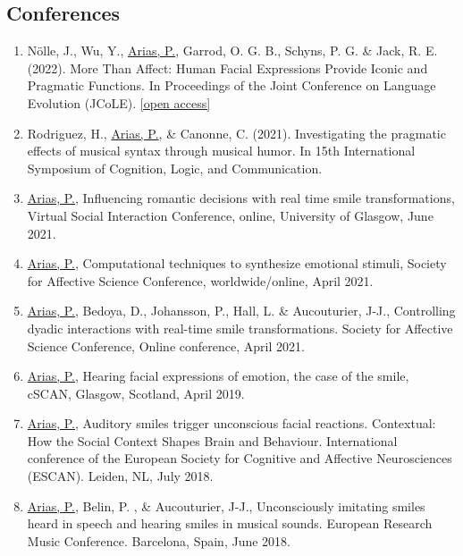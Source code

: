 \documentclass[a4paper, 11pt]{article}
\begin{document}
\subsection*{Conferences}
\begin{enumerate}
	\item Nölle, J., Wu, Y., \ul{Arias, P.}, Garrod, O. G. B., Schyns, P. G. \& Jack, R. E. (2022). More Than Affect: Human Facial Expressions Provide Iconic and Pragmatic Functions. In Proceedings of the Joint Conference on Language Evolution (JCoLE). {\footnotesize \href{https://evolang.org/jcole2022/proceedings/papers/JCoLE2022_paper_262.pdf}{[open access]}}

	\item Rodriguez, H., \ul{Arias, P.}, \& Canonne, C. (2021). Investigating the pragmatic effects of musical syntax through musical humor. In 15th International Symposium of Cognition, Logic, and Communication.

	\item \ul{Arias, P.}, Influencing romantic decisions with real time smile transformations, Virtual Social Interaction Conference, online, University of Glasgow, June 2021.

	\item \ul{Arias, P.}, Computational techniques to synthesize emotional stimuli, Society for Affective Science Conference, worldwide/online, April 2021.

	\item \ul{Arias, P.}, Bedoya, D., Johansson, P., Hall, L. \& Aucouturier, J-J., Controlling dyadic interactions with real-time smile transformations. Society for Affective Science Conference, Online conference, April 2021.
	
	\item \ul{Arias, P.}, Hearing facial expressions of emotion, the case of the smile, cSCAN, Glasgow, Scotland, April 2019.

	\item \ul{Arias, P.}, Auditory smiles trigger unconscious facial reactions. Contextual: How the Social Context Shapes Brain and Behaviour. International conference of the European Society for Cognitive and Affective Neurosciences (ESCAN). Leiden, NL, July 2018. 

	\item \ul{Arias, P.}, Belin, P. , \& Aucouturier, J-J., Unconsciously imitating smiles heard in speech \textemdash and hearing smiles in musical sounds. European Research Music Conference. Barcelona, Spain, June 2018. 


\end{enumerate}
\end{document}
